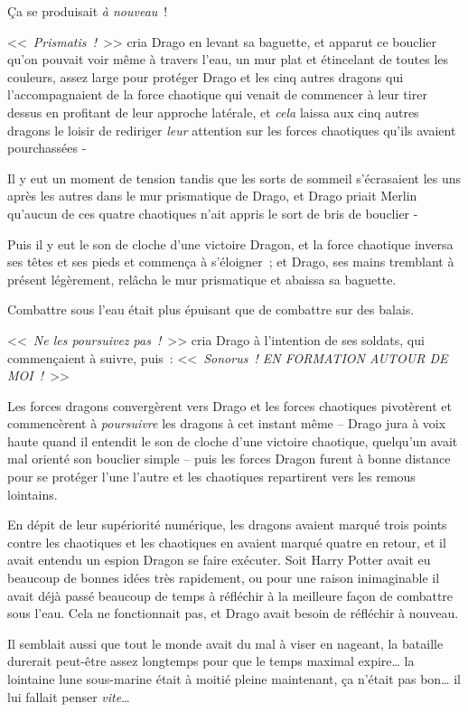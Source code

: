Ça se produisait \emph{à nouveau}~!

<<~\emph{Prismatis~!}~>> cria Drago en levant sa baguette, et apparut ce bouclier qu'on pouvait voir même à travers l'eau, un mur plat et étincelant de toutes les couleurs, assez large pour protéger Drago et les cinq autres dragons qui l'accompagnaient de la force chaotique qui venait de commencer à leur tirer dessus en profitant de leur approche latérale, et \emph{cela} laissa aux cinq autres dragons le loisir de rediriger \emph{leur} attention sur les forces chaotiques qu'ils avaient pourchassées -

Il y eut un moment de tension tandis que les sorts de sommeil s'écrasaient les uns après les autres dans le mur prismatique de Drago, et Drago priait Merlin qu'aucun de ces quatre chaotiques n'ait appris le sort de bris de bouclier -

Puis il y eut le son de cloche d'une victoire Dragon, et la force chaotique inversa ses têtes et ses pieds et commença à s'éloigner~; et Drago, ses mains tremblant à présent légèrement, relâcha le mur prismatique et abaissa sa baguette.

Combattre sous l'eau était plus épuisant que de combattre sur des balais.

<<~\emph{Ne les poursuivez pas~!}~>> cria Drago à l'intention de ses soldats, qui commençaient à suivre, puis~: <<~\emph{Sonorus~! EN FORMATION AUTOUR DE MOI~!}~>>

Les forces dragons convergèrent vers Drago et les forces chaotiques pivotèrent et commencèrent à \emph{poursuivre} les dragons à cet instant même -- Drago jura à voix haute quand il entendit le son de cloche d'une victoire chaotique, quelqu'un avait mal orienté son bouclier simple -- puis les forces Dragon furent à bonne distance pour se protéger l'une l'autre et les chaotiques repartirent vers les remous lointains.

En dépit de leur supériorité numérique, les dragons avaient marqué trois points contre les chaotiques et les chaotiques en avaient marqué quatre en retour, et il avait entendu un espion Dragon se faire exécuter. Soit Harry Potter avait eu beaucoup de bonnes idées très rapidement, ou pour une raison inimaginable il avait déjà passé beaucoup de temps à réfléchir à la meilleure façon de combattre sous l'eau. Cela ne fonctionnait pas, et Drago avait besoin de réfléchir à nouveau.

Il semblait aussi que tout le monde avait du mal à viser en nageant, la bataille durerait peut-être assez longtemps pour que le temps maximal expire… la lointaine lune sous-marine était à moitié pleine maintenant, ça n'était pas bon… il lui fallait penser \emph{vite}…

